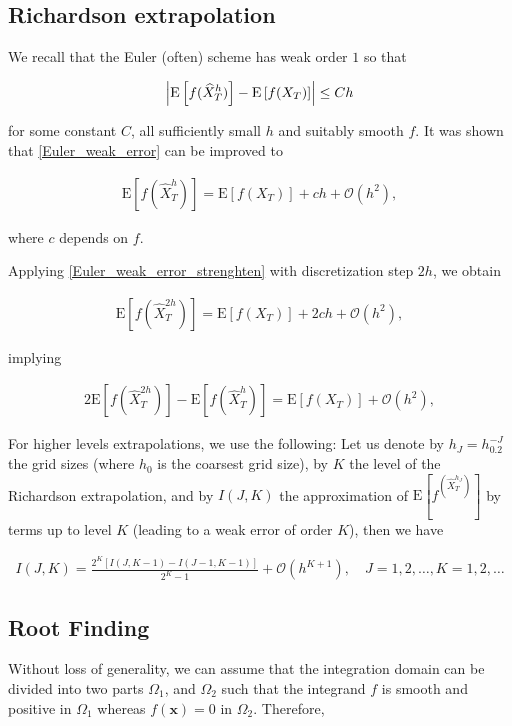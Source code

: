 \documentclass[11pt]{article}
\newcommand{\expt}[1]{\mathrm{E}\left[#1\right]}
\newcommand{\COMMA}{,}
\newcommand{\Ordo}[1]{{\mathcal{O}}\left(#1\right)}
\begin{document}
\subsection{Richardson extrapolation}\label{sec:Richardson extrapolation}


We  recall that the Euler (often) scheme has weak order $1$ so that

\begin{align}\label{Euler_weak_error}
	\abs{\expt{f(\hat{X}_T^h)}-\expt{f(X_T)} }  \leq C h
\end{align}

for some constant $C$, all sufficiently small $h$ and suitably smooth $f$. It was shown that \ref{Euler_weak_error} can be improved to


\begin{align}\label{Euler_weak_error_strenghten}
	\expt{f(\hat{X}_T^h)}= \expt{f(X_T)} + c h +\Ordo{h^2} \COMMA
\end{align}


where $c$ depends on $f$. 

Applying \ref{Euler_weak_error_strenghten} with discretization step $2h$, we  obtain

\begin{align}\label{Euler_weak_error_strenghten_2h}
	\expt{f(\hat{X}_T^{2h})}= \expt{f(X_T)} + 2 c h +\Ordo{h^2} \COMMA
\end{align}

implying

\begin{align}\label{Richardson_extrapol}
	2 \expt{f(\hat{X}_T^{2h})}- \expt{f(\hat{X}_T^{h})} =\expt{f(X_T)} + \Ordo{h^2} \COMMA
\end{align}

For higher levels extrapolations, we use the following: Let us denote by $h_J=h_0.2^{-J}$ the grid sizes (where $h_0$ is the coarsest grid size), by $K$ the level of the Richardson extrapolation, and by $I(J,K)$ the approximation of $\expt{f^(\hat{X}_T^{h_J})}$ by terms up to level $K$ (leading to a weak error of order $K$), then we have

\begin{align}
	I(J,K)=\frac{2^K\left[I(J,K-1)-I(J-1,K-1)\right]}{2^K-1} +\Ordo{h^{K+1}},\quad J=1,2,\dots, K=1,2,\dots
\end{align}

\subsection{Root Finding}\label{sec: Root Finding}
Without loss of generality, we can assume that the integration domain  can
be divided into two parts $\Omega_1$, and $\Omega_2$ such that the integrand $f$ is smooth and positive in $\Omega_1$
whereas $f(\mathbf{x}) = 0$ in $\Omega_2$. Therefore,
\end{document}
